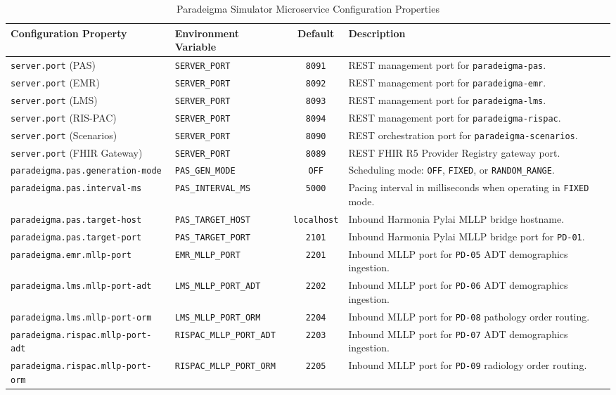 \begin{table}[htbp]
\centering
\small
\begin{tabularx}{\textwidth}{l l c X}
\toprule
\textbf{Configuration Property} & \textbf{Environment Variable} & \textbf{Default} & \textbf{Description} \\
\midrule
\texttt{server.port} (PAS) & \texttt{SERVER\_PORT} & \texttt{8091} & REST management port for \texttt{paradeigma-pas}. \\
\texttt{server.port} (EMR) & \texttt{SERVER\_PORT} & \texttt{8092} & REST management port for \texttt{paradeigma-emr}. \\
\texttt{server.port} (LMS) & \texttt{SERVER\_PORT} & \texttt{8093} & REST management port for \texttt{paradeigma-lms}. \\
\texttt{server.port} (RIS-PAC) & \texttt{SERVER\_PORT} & \texttt{8094} & REST management port for \texttt{paradeigma-rispac}. \\
\texttt{server.port} (Scenarios) & \texttt{SERVER\_PORT} & \texttt{8090} & REST orchestration port for \texttt{paradeigma-scenarios}. \\
\texttt{server.port} (FHIR Gateway) & \texttt{SERVER\_PORT} & \texttt{8089} & REST FHIR R5 Provider Registry gateway port. \\
\addlinespace
\texttt{paradeigma.pas.generation-mode} & \texttt{PAS\_GEN\_MODE} & \texttt{OFF} & Scheduling mode: \texttt{OFF}, \texttt{FIXED}, or \texttt{RANDOM\_RANGE}. \\
\texttt{paradeigma.pas.interval-ms} & \texttt{PAS\_INTERVAL\_MS} & \texttt{5000} & Pacing interval in milliseconds when operating in \texttt{FIXED} mode. \\
\texttt{paradeigma.pas.target-host} & \texttt{PAS\_TARGET\_HOST} & \texttt{localhost} & Inbound Harmonia Pylai MLLP bridge hostname. \\
\texttt{paradeigma.pas.target-port} & \texttt{PAS\_TARGET\_PORT} & \texttt{2101} & Inbound Harmonia Pylai MLLP bridge port for \texttt{PD-01}. \\
\addlinespace
\texttt{paradeigma.emr.mllp-port} & \texttt{EMR\_MLLP\_PORT} & \texttt{2201} & Inbound MLLP port for \texttt{PD-05} ADT demographics ingestion. \\
\texttt{paradeigma.lms.mllp-port-adt} & \texttt{LMS\_MLLP\_PORT\_ADT} & \texttt{2202} & Inbound MLLP port for \texttt{PD-06} ADT demographics ingestion. \\
\texttt{paradeigma.lms.mllp-port-orm} & \texttt{LMS\_MLLP\_PORT\_ORM} & \texttt{2204} & Inbound MLLP port for \texttt{PD-08} pathology order routing. \\
\texttt{paradeigma.rispac.mllp-port-adt} & \texttt{RISPAC\_MLLP\_PORT\_ADT} & \texttt{2203} & Inbound MLLP port for \texttt{PD-07} ADT demographics ingestion. \\
\texttt{paradeigma.rispac.mllp-port-orm} & \texttt{RISPAC\_MLLP\_PORT\_ORM} & \texttt{2205} & Inbound MLLP port for \texttt{PD-09} radiology order routing. \\
\bottomrule
\end{tabularx}
\caption{Paradeigma Simulator Microservice Configuration Properties}
\label{tab:paradeigma_config_matrix}
\end{table}

